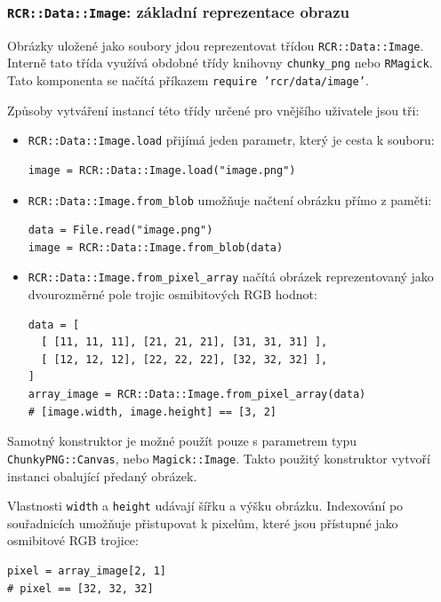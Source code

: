 \documentclass[a4paper]{article}
\begin{document}
\subsubsection{\texttt{RCR::Data::Image}: základní reprezentace obrazu}
Obrázky uložené jako soubory jdou reprezentovat třídou
\texttt{RCR::Data::Image}. Interně tato třída využívá obdobné třídy knihovny
\texttt{chunky\_png} nebo \texttt{RMagick}.
Tato komponenta se načítá příkazem \texttt{require 'rcr/data/image'}.

Způsoby vytváření instancí této třídy určené pro vnějšího uživatele jsou tři:
\begin{itemize}
\item \texttt{RCR::Data::Image.load} přijímá jeden parametr, který je cesta k
souboru:
\begin{lstlisting}
image = RCR::Data::Image.load("image.png")
\end{lstlisting}
\item \texttt{RCR::Data::Image.from\_blob} umožňuje načtení obrázku přímo z
paměti:
\begin{lstlisting}
data = File.read("image.png")
image = RCR::Data::Image.from_blob(data)
\end{lstlisting}
\item \texttt{RCR::Data::Image.from\_pixel\_array} načítá obrázek reprezentovaný
jako dvourozměrné pole trojic osmibitových RGB hodnot:
\begin{lstlisting}
data = [
  [ [11, 11, 11], [21, 21, 21], [31, 31, 31] ],
  [ [12, 12, 12], [22, 22, 22], [32, 32, 32] ],
]
array_image = RCR::Data::Image.from_pixel_array(data)
# [image.width, image.height] == [3, 2]
\end{lstlisting}
\end{itemize}

Samotný konstruktor je možné použít pouze s parametrem typu
\texttt{ChunkyPNG::Canvas}, nebo \texttt{Magick::Image}. Takto použitý
konstruktor vytvoří instanci obalující předaný obrázek.

Vlastnosti \texttt{width} a \texttt{height} udávají šířku a výšku obrázku.
Indexování po souřadnicích umožňuje přistupovat k pixelům, které jsou přístupné
jako osmibitové RGB trojice:
\begin{lstlisting}
pixel = array_image[2, 1]
# pixel == [32, 32, 32]
\end{lstlisting}
\end{document}
